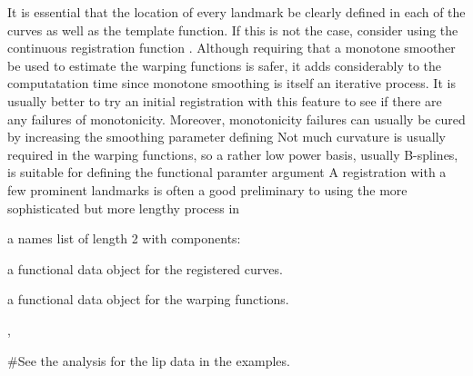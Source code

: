 \documentclass{article}
\begin{document}
\begin{Details}\relax
It is essential that the location of every landmark be clearly
defined
in each of the curves as well as the template function.  If this is not
the case, consider using the continuous registration function
.
Although requiring that a monotone smoother be used to estimate the
warping functions is safer, it adds considerably to the computatation
time since monotone smoothing is itself an iterative process.  It is
usually better to try an initial registration with this feature to see
if there are any failures of monotonicity.  Moreover, monotonicity
failures can usually be cured by increasing the smoothing parameter
defining 
Not much curvature is usually required in the warping functions, so
a rather low power basis, usually B-splines, is suitable for
defining the functional paramter argument 
A registration with a few prominent landmarks is often a good
preliminary to using the more sophisticated but more lengthy process in
\end{Details}
\begin{Value}
a names list of length 2 with components:

\begin{ldescription}
\item[\code{fdreg}] a functional data object for the registered curves.

\item[\code{warpfd}] a functional data object for the warping functions.

\end{ldescription}
\end{Value}
\begin{SeeAlso}\relax
{}, 
\end{SeeAlso}
\begin{Examples}
\begin{ExampleCode}
#See the analysis for the lip data in the examples.
\end{ExampleCode}
\end{Examples}
\end{document}
